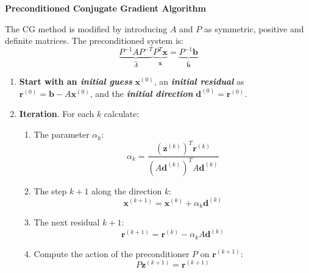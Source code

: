 \newpage

\begin{flushleft}
    \textcolor{Green3}{ \textbf{Preconditioned Conjugate Gradient Algorithm}}
\end{flushleft}
The CG method is modified by introducing $A$ and $P$ as symmetric, positive and definite matrices. The preconditioned system is:
\begin{equation*}
    \underbrace{P^{-1} A P^{-T}}_{\widehat{A}} \underbrace{P^{T} \mathbf{x}}_{\widehat{\mathbf{x}}} = \underbrace{P^{-1}\mathbf{b}}_{\widehat{\mathbf{b}}}
\end{equation*}
\begin{enumerate}
    \item \textbf{Start with an \emph{initial guess}} $\mathbf{x}^{\left(0\right)}$, an \textbf{\emph{initial residual}} as $\mathbf{r}^{\left(0\right)} = \mathbf{b} - A\mathbf{x}^{\left(0\right)}$, and the \textbf{\emph{initial direction}} $\mathbf{d}^{\left(0\right)} = \mathbf{r}^{\left(0\right)}$.
    \item \textbf{Iteration}. For each $k$ calculate:
    \begin{enumerate}
        \item The parameter $\alpha_{k}$:
        \begin{equation}
            \alpha_{k} = \dfrac{
                \left(\mathbf{z}^{\left(k\right)}\right)^{T}\mathbf{r}^{\left(k\right)}
            }{
                \left(A\mathbf{d}^{\left(k\right)}\right)^{T}A\mathbf{d}^{\left(k\right)}
            }
        \end{equation}

        \item The step $k+1$ along the direction $k$:
        \begin{equation}
            \mathbf{x}^{\left(k+1\right)} = \mathbf{x}^{\left(k\right)} + \alpha_{k}\mathbf{d}^{\left(k\right)}
        \end{equation}

        \item The next residual $k+1$:
        \begin{equation}
            \mathbf{r}^{\left(k+1\right)} = \mathbf{r}^{\left(k\right)} - \alpha_{k}A\mathbf{d}^{\left(k\right)}
        \end{equation}

        \item Compute the action of the preconditioner $P$ on $\mathbf{r}^{\left(k+1\right)}$:
        \begin{equation}
            P\mathbf{z}^{\left(k+1\right)} = \mathbf{r}^{\left(k+1\right)}
        \end{equation}


\end{enumerate}
\end{enumerate}
